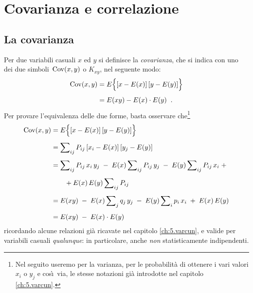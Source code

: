 
\chapter{Covarianza e correlazione}%
\label{ch:c.covcor}
\section{La covarianza}%
%
\label{ch:c.covar}
Per due variabili casuali $x$ ed $y$ si definisce la
\emph{covarianza}, che si indica con uno dei due simboli $
\, \operatorname{Cov} (x, y) $ o $ K_{xy} $, nel seguente modo:
\begin{align*}
  \operatorname{Cov} (x, y) &= E \Bigl \{ \left[
    \vphantom{y} x - E(x) \right] \left[ y - E(y)
    \right] \Bigr \} \\[1ex]
   &= E(x y) - E(x) \cdot E(y) \;\; .
\end{align*}
Per provare l'equivalenza delle due forme, basta osservare
che\/\footnote{Nel seguito useremo per la varianza, per le
  probabilit\`a di ottenere i vari valori $x_i $ o $y_j $ e
  cos\`\i\ via, le stesse notazioni gi\`a introdotte nel
  capitolo \ref{ch:5.varcun}.}
\begin{align*}
   \operatorname{Cov} (x, y) &= E \Bigl \{ \left[ \vphantom{y} x
     - E(x) \right] \left[ y - E(y) \right] \Bigr \}
     \\[1ex]
   &= \sum \nolimits_{ij} P_{ij} \left[ \vphantom{y}
     x_i - E(x) \right] \left[ y_j - E(y) \right]
     \\[1ex]
   &= \sum \nolimits_{ij} P_{ij} \, x_i \, y_j \; - \;
     E(x) \sum \nolimits_{ij} P_{ij} \, y_j \; - \;
     E(y) \sum \nolimits_{ij} P_{ij} \, x_i \; +
     \\[1ex]
   &\qquad + E(x) \, E(y) \sum \nolimits_{ij} P_{ij}
     \\[1ex]
   &= E(x y) \; - \; E(x) \sum \nolimits_j q_j \, y_j
     \; - \; E(y) \sum \nolimits_i p_i \, x_i \; + \;
     E(x) \, E(y) \\[1ex]
   &= E(x y) \; - \; E(x) \cdot E(y)
\end{align*}
ricordando alcune relazioni gi\`a ricavate nel capitolo
\ref{ch:5.varcun}, e valide per variabili casuali
\emph{qualunque}: in particolare, anche \emph{non}
statisticamente indipendenti.

